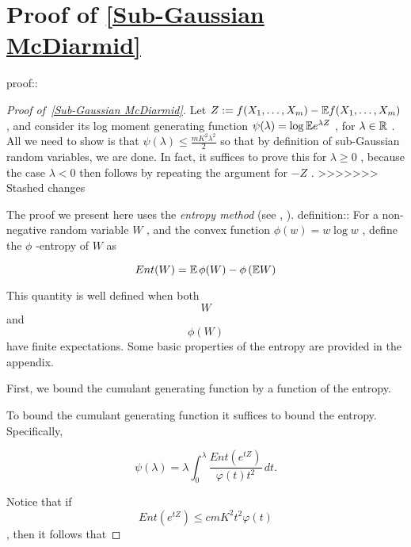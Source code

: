 \documentclass{article}
\begin{document}
\section{Proof of \autoref{Sub-Gaussian McDiarmid}}
\label{section:Proof of \autoref{Sub-Gaussian McDiarmid}}
proof::
\begin{proof}[Proof of~{\autoref{Sub-Gaussian McDiarmid}}]
\label{proof:Sub-Gaussian McDiarmid}
Let  $Z := f(X_1, \dots, X_m) - \mathbb{E} f(X_1, \dots, X_m)$ , and consider its log moment generating function  $\psi(\lambda) = \log \mathbb{E} e^{\lambda Z}$ , for  $\lambda \in \mathbb{R}$ . All we need to show is that  $\psi(\lambda) \leq \frac{mK^2\lambda^2}{2}$  so that by definition of sub-Gaussian random variables, we are done. In fact, it suffices to prove this for  $\lambda \geq 0$ , because the case  $\lambda < 0$  then follows by repeating the argument for  $-Z$ .
>>>>>>> Stashed changes

The proof we present here uses the  \textit{entropy method}  (see \cite{boucheronConcentrationInequalitiesNonasymptotic2016}, \cite{wainwrightHighDimensionalStatisticsNonAsymptotic2019}).  definition:: For a non-negative random variable  $W$ , and the convex function  $\phi(w) = w\log w$ , define the  $\phi$ -entropy of  $W$  as


\begin{equation*}
Ent(W) = \mathbb{E}\,\phi(W) - \phi\left(\mathbb{E} W\right)
\end{equation*}

 This quantity is well defined when both  
\begin{equation*}
W
\end{equation*}
  and  
\begin{equation*}
\phi(W)
\end{equation*}
  have finite expectations. Some basic properties of the entropy are provided in the appendix.

First, we bound the cumulant generating function by a function of the entropy.


\begin{lemma}
\label{Herbst's Argument}
To bound the cumulant generating function it suffices to bound the entropy. Specifically,


\begin{equation*}
\psi(\lambda) =\lambda \int_0^\lambda  \frac{Ent(e^{tZ})}{\varphi(t)t^2}  \, dt.
\end{equation*}


\end{lemma}
 Notice that if  
\begin{equation*}
Ent(e^{tZ}) \leq cmK^2 t^2 \varphi(t)
\end{equation*}
 , then it follows that



\end{proof}
\end{document}
